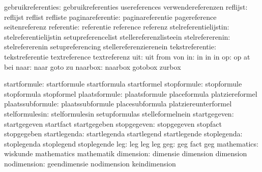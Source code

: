            gebruikreferenties:  gebruikreferenties           usereferences
                                verwendereferenzen
                     reflijst:  reflijst                     reflist
                                refliste
             paginareferentie:  paginareferentie             pagereference
                                seitenreferenz
                   referentie:  referentie                   reference
                                referenz
        stelreferentielijstin:  stelreferentielijstin        setupreferencelist
                                stellereferenzlisteein
              stelrefererenin:  stelrefererenin              setupreferencing
                                stellereferenzierenein
              tekstreferentie:  tekstreferentie              textreference
                                textreferenz
                          uit:  uit                          from
                                von
                           in:  in                           in
                                in
                           op:  op                           at
                                bei
                         naar:  naar                         goto
                                zu
                      naarbox:  naarbox                      gotobox
                                zurbox

                 startformule:  startformule                 startformula
                                startformel
                  stopformule:  stopformule                  stopformula
                                stopformel
                plaatsformule:  plaatsformule                placeformula
                                platziereformel
             plaatssubformule:  plaatssubformule             placesubformula
                                platziereunterformel
               stelformulesin:  stelformulesin               setupformulas
                                stelleformelnein
                 startgegeven:  startgegeven                 startfact
                                startgegeben
                  stopgegeven:  stopgegeven                  stopfact
                                stopgegeben
                 startlegenda:  startlegenda                 startlegend
                                startlegende
                  stoplegenda:  stoplegenda                  stoplegend
                                stoplegende
leg: leg leg leg 
geg: geg fact geg
                  mathematics:  wiskunde                     mathematics
                                mathematik
                    dimension:  dimensie                     dimension
                                dimension
                  nodimension:  geendimensie                 nodimension
                                keindimension

